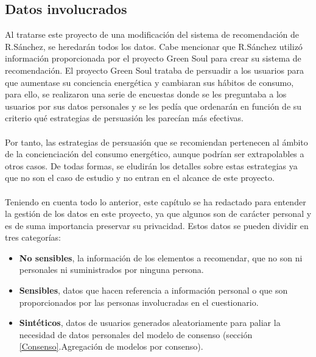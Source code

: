 \subsection{Datos involucrados}
Al tratarse este proyecto de una modificación del sistema de recomendación de R.Sánchez, se heredarán todos los datos. Cabe mencionar que R.Sánchez utilizó información proporcionada por el proyecto Green Soul\autocite{EcoawarePersuasiveNetworked} para crear su sistema de recomendación. El proyecto Green Soul trataba de persuadir a los usuarios para que aumentase su conciencia energética y cambiaran sus hábitos de consumo, para ello, se realizaron una serie de encuestas donde se les preguntaba a los usuarios por sus datos personales y se les pedía que ordenarán en función de su criterio qué estrategias de persuasión les parecían más efectivas.
\\ \\
Por tanto, las estrategias de persuasión que se recomiendan pertenecen al ámbito de la concienciación del consumo energético, aunque podrían ser extrapolables a otros casos. De todas formas, se eludirán los detalles sobre estas estrategias ya que no son el caso de estudio y no entran en el alcance de este proyecto.
\\ \\
Teniendo en cuenta todo lo anterior, este capítulo se ha redactado para entender la gestión de los datos en este proyecto, ya que algunos son de carácter personal y es de suma importancia preservar su privacidad. Estos datos se pueden dividir en tres categorías:
\begin{itemize}
    \item \textbf{No sensibles}, la información de los elementos a recomendar, que no son ni personales ni suministrados por ninguna persona.
    \item  \textbf{Sensibles}, datos que hacen referencia a información personal o que son proporcionados por las personas involucradas en el cuestionario.
    \item \textbf{Sintéticos}, datos de usuarios generados aleatoriamente para paliar la necesidad de datos personales del modelo de consenso (sección \ref{Consenso}.Agregación de modelos por consenso).
\end{itemize} 

